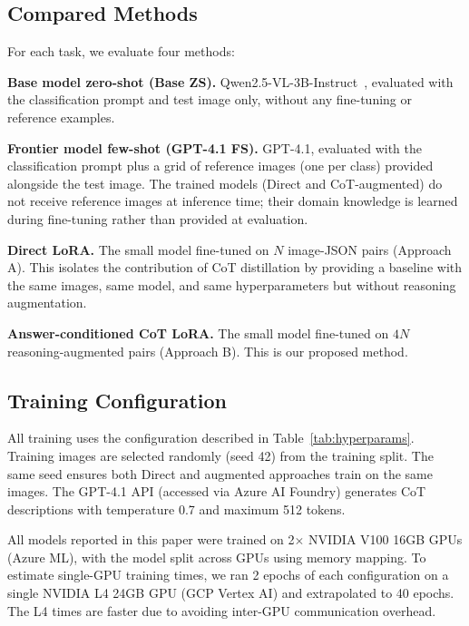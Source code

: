 \documentclass{bmvc2k}
\begin{document}
\subsection{Compared Methods}

For each task, we evaluate four methods:

\noindent\textbf{Base model zero-shot (Base ZS).} Qwen2.5-VL-3B-Instruct~\cite{wang2024qwen2vl}, evaluated with the classification prompt and test image only, without any fine-tuning or reference examples.

\noindent\textbf{Frontier model few-shot (GPT-4.1 FS).} GPT-4.1, evaluated with the classification prompt plus a grid of reference images (one per class) provided alongside the test image. The trained models (Direct and CoT-augmented) do not receive reference images at inference time; their domain knowledge is learned during fine-tuning rather than provided at evaluation.

\noindent\textbf{Direct LoRA.} The small model fine-tuned on $N$ image-JSON pairs (Approach A). This isolates the contribution of CoT distillation by providing a baseline with the same images, same model, and same hyperparameters but without reasoning augmentation.

\noindent\textbf{Answer-conditioned CoT LoRA.} The small model fine-tuned on $4N$ reasoning-augmented pairs (Approach B). This is our proposed method.

\subsection{Training Configuration}

All training uses the configuration described in Table~\ref{tab:hyperparams}. Training images are selected randomly (seed 42) from the training split. The same seed ensures both Direct and augmented approaches train on the same images. The GPT-4.1 API (accessed via Azure AI Foundry) generates CoT descriptions with temperature 0.7 and maximum 512 tokens.

All models reported in this paper were trained on 2$\times$ NVIDIA V100 16GB GPUs (Azure ML), with the model split across GPUs using memory mapping. To estimate single-GPU training times, we ran 2 epochs of each configuration on a single NVIDIA L4 24GB GPU (GCP Vertex AI) and extrapolated to 40 epochs. The L4 times are faster due to avoiding inter-GPU communication overhead.
\end{document}
